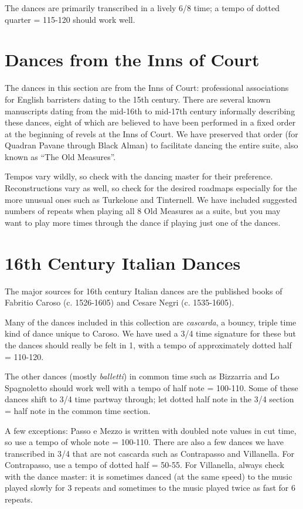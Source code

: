 \documentclass[11pt]{book}
\begin{document}
The dances are primarily transcribed in a lively 6/8 time; a tempo of dotted
quarter = 115-120 should work well.



\chapter{Dances from the Inns of Court}

The dances in this section are from the Inns of Court: professional
associations for English barristers dating to the 15th century. There are
several known manuscripts dating from the mid-16th to mid-17th century
informally describing these dances, eight of which are believed to have been
performed in a fixed order at the beginning of revels at the Inns of Court. We
have preserved that order (for Quadran Pavane through Black Alman) to
facilitate dancing the entire suite, also known as ``The Old Measures''.

Tempos vary wildly, so check with the dancing master for their preference.
Reconstructions vary as well, so check for the desired roadmaps especially for
the more unusual ones such as Turkelone and Tinternell. We have included
suggested numbers of repeats when playing all 8 Old Measures as a suite, but
you may want to play more times through the dance if playing just one of the
dances.



\chapter{16th Century Italian Dances}

The major sources for 16th century Italian dances are the published books of
Fabritio Caroso (c. 1526-1605) and Cesare Negri (c. 1535-1605).

Many of the dances included in this collection are {\em cascarda}, a bouncy,
triple time kind of dance unique to Caroso. We have used a 3/4 time signature
for these but the dances should really be felt in 1, with a tempo of
approximately dotted half = 110-120.

The other dances (mostly {\em balletti}) in common time such as Bizzarria and
Lo Spagnoletto should work well with a tempo of half note = 100-110. Some of
these dances shift to 3/4 time partway through; let dotted half note in the 3/4
section = half note in the common time section. 

A few exceptions: Passo e Mezzo is written with doubled note values in cut
time, so use a tempo of whole note = 100-110. There are also a few dances we
have transcribed in 3/4 that are not cascarda such as Contrapasso and
Villanella. For Contrapasso, use a tempo of dotted half = 50-55. For
Villanella, always check with the dance master: it is sometimes danced (at the
same speed) to the music played slowly for 3 repeats and sometimes to the music
played twice as fast for 6 repeats. 
\end{document}
